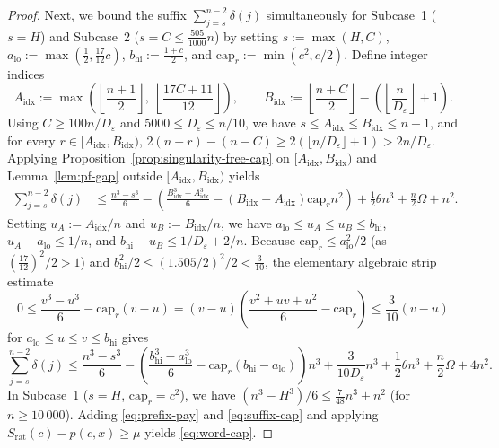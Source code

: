 \documentclass[11pt]{article}
\theoremstyle{definition}
\theoremstyle{remark}
\begin{document}
\begin{proof}
Next, we bound the suffix $\sum_{j = s}^{n - 2} \delta(j)$ simultaneously for Subcase~1 ($s = H$) and Subcase~2 ($s = C \le \frac{505}{1000} n$) by setting $s := \max(H, C)$, $a_{\mathrm{lo}} := \max(\frac{1}{2}, \frac{17}{12} c)$, $b_{\mathrm{hi}} := \frac{1 + c}{2}$, and $\mathrm{cap}_r := \min(c^2, c/2)$. Define integer indices
\[
  A_{\mathrm{idx}} := \max\!\left(\left\lfloor \frac{n + 1}{2} \right\rfloor,\; \left\lfloor \frac{17 C + 11}{12} \right\rfloor\right), \qquad
  B_{\mathrm{idx}} := \left\lfloor \frac{n + C}{2} \right\rfloor - \left(\left\lfloor \frac{n}{D_\varepsilon} \right\rfloor + 1\right).
\]
Using $C \ge 100 n / D_\varepsilon$ and $5000 \le D_\varepsilon \le n / 10$, we have $s \le A_{\mathrm{idx}} \le B_{\mathrm{idx}} \le n - 1$, and for every $r \in [A_{\mathrm{idx}}, B_{\mathrm{idx}})$, $2(n - r) - (n - C) \ge 2(\lfloor n / D_\varepsilon \rfloor + 1) > 2 n / D_\varepsilon$. Applying Proposition~\ref{prop:singularity-free-cap} on $[A_{\mathrm{idx}}, B_{\mathrm{idx}})$ and Lemma~\ref{lem:pf-gap} outside $[A_{\mathrm{idx}}, B_{\mathrm{idx}})$ yields
\begin{align*}
  \sum_{j = s}^{n - 2} \delta(j)
  &\le \frac{n^3 - s^3}{6} - \left(\frac{B_{\mathrm{idx}}^3 - A_{\mathrm{idx}}^3}{6} - (B_{\mathrm{idx}} - A_{\mathrm{idx}}) \mathrm{cap}_r n^2\right)
    + \frac{1}{2} \theta n^3 + \frac{n}{2} \Omega + n^2.
\end{align*}
Setting $u_A := A_{\mathrm{idx}} / n$ and $u_B := B_{\mathrm{idx}} / n$, we have $a_{\mathrm{lo}} \le u_A \le u_B \le b_{\mathrm{hi}}$, $u_A - a_{\mathrm{lo}} \le 1/n$, and $b_{\mathrm{hi}} - u_B \le 1/D_\varepsilon + 2/n$. Because $\mathrm{cap}_r \le a_{\mathrm{lo}}^2 / 2$ (as $(\frac{17}{12})^2 / 2 > 1$) and $b_{\mathrm{hi}}^2 / 2 \le (1.505/2)^2 / 2 < \frac{3}{10}$, the elementary algebraic strip estimate
\[
  0 \le \frac{v^3 - u^3}{6} - \mathrm{cap}_r (v - u)
    = (v - u)\left(\frac{v^2 + uv + u^2}{6} - \mathrm{cap}_r\right)
    \le \frac{3}{10}(v - u)
\]
for $a_{\mathrm{lo}} \le u \le v \le b_{\mathrm{hi}}$ gives
\begin{equation}\label{eq:suffix-cap}
  \sum_{j = s}^{n - 2} \delta(j)
  \le \frac{n^3 - s^3}{6} - \left(\frac{b_{\mathrm{hi}}^3 - a_{\mathrm{lo}}^3}{6} - \mathrm{cap}_r (b_{\mathrm{hi}} - a_{\mathrm{lo}})\right) n^3
    + \frac{3}{10 D_\varepsilon} n^3 + \frac{1}{2} \theta n^3 + \frac{n}{2} \Omega + 4 n^2.
\end{equation}
In Subcase~1 ($s = H$, $\mathrm{cap}_r = c^2$), we have $(n^3 - H^3)/6 \le \frac{7}{48} n^3 + n^2$ (for $n \ge 10\,000$). Adding \eqref{eq:prefix-pay} and \eqref{eq:suffix-cap} and applying $S_{\mathrm{rat}}(c) - p(c, x) \ge \mu$ yields \eqref{eq:word-cap}.


\end{proof}
\end{document}
